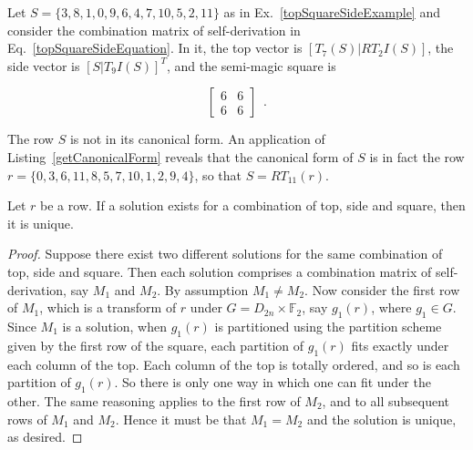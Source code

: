 \pagebreak
\begin{example}
Let $S = \{ 3, 8, 1, 0, 9, 6, 4, 7, 10, 5, 2, 11 \}$ as in Ex.~\ref{topSquareSideExample} and consider the combination matrix of self-derivation in Eq.~\ref{topSquareSideEquation}. In it, the top vector is $[T_7(S) | RT_2I(S)]$, the side vector is $[S | T_9I(S)]^T$, and the semi-magic square is

	\begin{equation}
        \left[
        \begin{array}{c|c}
            6 & 6 \\
            \hline
            6 & 6
        \end{array}
        \right] \enspace.
    \end{equation}
    
\noindent The row $S$ is not in its canonical form. An application of Listing~\ref{getCanonicalForm} reveals that the canonical form of $S$ is in fact the row $r = \{0, 3, 6, 11, 8, 5, 7, 10, 1, 2, 9, 4\}$, so that $S = RT_{11}(r)$.
\end{example}

\begin{theorem}
	\label{topSquareSideTheorem}
	Let $r$ be a row. If a solution exists for a combination of top, side and square, then it is unique.
	\begin{proof}
	Suppose there exist two different solutions for the same combination of top, side and square. Then each solution comprises a combination matrix of self-derivation, say $M_1$ and $M_2$. By assumption $M_1 \ne M_2$. Now consider the first row of $M_1$, which is a transform of $r$ under $G = D_{2n} \times \mathbb{F}_2$, say $g_1(r)$, where $g_1 \in G$. Since $M_1$ is a solution, when $g_1(r)$ is partitioned using the partition scheme given by the first row of the square, each partition of $g_1(r)$ fits exactly under each column of the top. Each column of the top is totally ordered, and so is each partition of $g_1(r)$. So there is only one way in which one can fit under the other. The same reasoning applies to the first row of $M_2$, and to all subsequent rows of $M_1$ and $M_2$. Hence it must be that $M_1 = M_2$ and the solution is unique, as desired.
	\end{proof}
\end{theorem}

